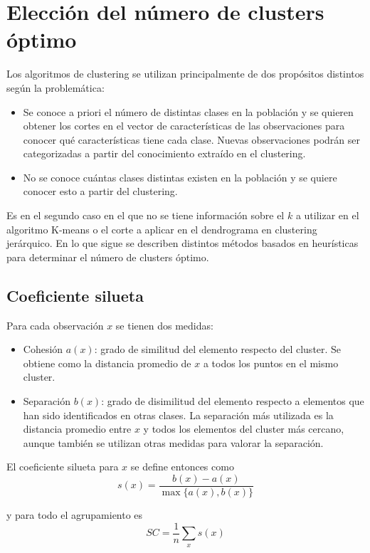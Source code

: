 \section{Elección del número de clusters óptimo}
Los algoritmos de clustering se utilizan principalmente de dos propósitos distintos según la problemática:
\begin{itemize}
\item Se conoce a priori el número de distintas clases en la población y se quieren obtener los cortes en el vector de características de las observaciones para conocer qué características tiene cada clase. Nuevas observaciones podrán ser categorizadas a partir del conocimiento extraído en el clustering.
\item No se conoce cuántas clases distintas existen en la población y se quiere conocer esto a partir del clustering.
\end{itemize}

Es en el segundo caso en el que no se tiene información sobre el $k$ a utilizar en el algoritmo K-means o el corte a aplicar en el dendrograma en clustering jerárquico. En lo que sigue se describen distintos métodos basados en heurísticas para determinar el número de clusters óptimo. \\

\subsection{Coeficiente silueta}
Para cada observación $x$ se tienen dos medidas:
\begin{itemize}
\item Cohesión $a(x)$: grado de similitud del elemento respecto del cluster. Se obtiene como la distancia promedio de $x$ a todos los puntos en el mismo cluster. 
\item Separación $b(x)$: grado de disimilitud del elemento respecto a elementos que han sido identificados en otras clases. La separación más utilizada es la distancia promedio entre $x$ y todos los elementos del cluster más cercano, aunque también se utilizan otras medidas para valorar la separación.
\end{itemize}

El coeficiente silueta para $x$ se define entonces como
\begin{equation}
s(x) = \frac{\displaystyle b(x) - a(x)}{\displaystyle \max{\{a(x), b(x)\}}} \nonumber
\end{equation}

y para todo el agrupamiento es
\begin{equation}
SC = \frac{1}{n}\sum_{x}s(x)
\end{equation}

